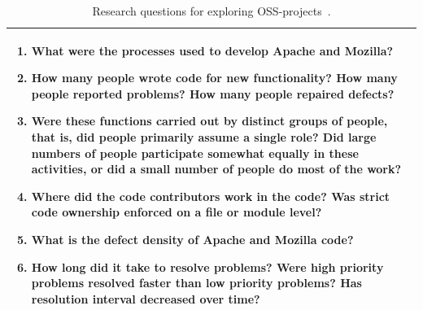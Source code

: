 \documentclass[a4paper,11pt]{article}
\begin{document}
{\begin{table}[h]
	\centering
	\begin{tabular}{ | p{} |}
		\hline
		\begin{enumerate}
			\item What were the processes used to develop Apache and Mozilla?
			\item How many people wrote code for new functionality? How many people reported problems? How many people repaired defects?
			\item Were these functions carried out by distinct groups of people, that is, did people primarily assume a single role? Did large numbers of people participate somewhat equally in these activities, or did a small number of people do most of the work?
			\item Where did the code contributors work in the code? Was strict code ownership enforced on a file or module level?
			\item What is the defect density of Apache and Mozilla code?
			\item How long did it take to resolve problems? Were high priority problems resolved faster than low priority problems? Has resolution interval 	decreased over time?
		\end{enumerate}\\
		\hline
	\end{tabular}
	\caption{Research questions for exploring OSS-projects~\cite{Mockus2002a}.}
	\label{tab:apache}
\end{table}

}
\end{document}

